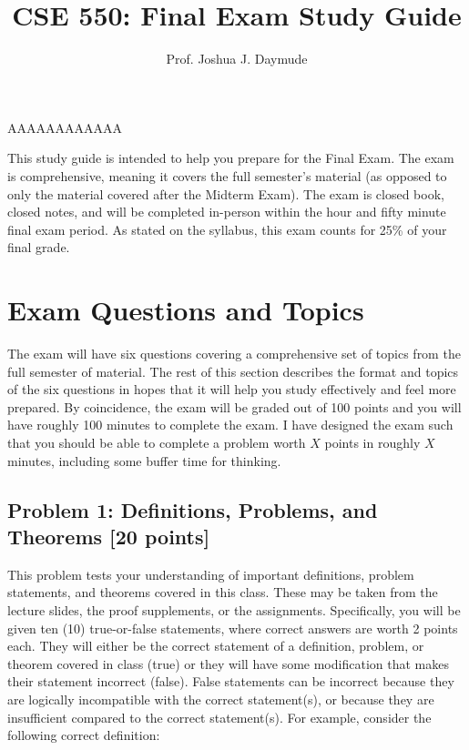 \documentclass[10pt]{article}
\title{\large{\textbf{CSE 550: Final Exam Study Guide}}}
\author{Prof. Joshua J. Daymude}
\date{}
\begin{document}
\maketitle

\thispagestyle{firststyle}

AAAAAAAAAAAA

This study guide is intended to help you prepare for the Final Exam.
The exam is comprehensive, meaning it covers the full semester's material (as opposed to only the material covered after the Midterm Exam).
The exam is closed book, closed notes, and will be completed in-person within the hour and fifty minute final exam period.
As stated on the syllabus, this exam counts for 25\% of your final grade.

\section{Exam Questions and Topics}

The exam will have six questions covering a comprehensive set of topics from the full semester of material.
The rest of this section describes the format and topics of the six questions in hopes that it will help you study effectively and feel more prepared.
By coincidence, the exam will be graded out of 100 points and you will have roughly 100 minutes to complete the exam.
I have designed the exam such that you should be able to complete a problem worth $X$ points in roughly $X$ minutes, including some buffer time for thinking.

\subsection{Problem 1: Definitions, Problems, and Theorems [20 points]}

This problem tests your understanding of important definitions, problem statements, and theorems covered in this class.
These may be taken from the lecture slides, the proof supplements, or the assignments.
Specifically, you will be given ten (10) true-or-false statements, where correct answers are worth 2 points each.
They will either be the correct statement of a definition, problem, or theorem covered in class (true) or they will have some modification that makes their statement incorrect (false).
False statements can be incorrect because they are logically incompatible with the correct statement(s), or because they are insufficient compared to the correct statement(s).
For example, consider the following correct definition:
\end{document}
